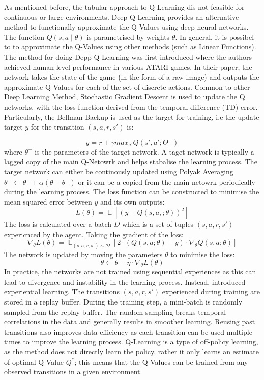 \documentclass[12pt,a4paper]{report}
\DeclareMathOperator{\EX}{\mathbb{E}}
\begin{document}
As mentioned before, the tabular approach to Q-Learning dis not feasible for continuous or large environments. Deep Q Learning provides an alternative method to functionally approximate the Q-Values using deep neural networks. The function $Q(s, a \mid \theta)$ is parametrised by weights $\theta$. In general, it is possibel to to approximate the Q-Values using other methods (such as Linear Functions).
The method for doing Depp Q Learning was first introduced \cite{Mnih2015} where the authors achieved human level performance in various ATARI games. In their paper, the network takes the state of the game (in the form of a raw image) and outputs the approximate Q-Values for each of the set of discrete actions. Common to other Deep Learning Method, Stochastic Gradient Descent is used to update the Q networks, with the loss function derived from the temporal difference (TD) error. Particularly, the Bellman Backup is used as the target for training, i.e the update target $y$ for the transition $(s, a, r, s')$ is: 

\[
  y = r + \gamma max_{a'} Q(s', a'; \Theta^-)
\]
where $\theta^-$ is the parameters of the target network. A taget network is typically a lagged copy of the main Q-Netowrk and helps stabalise the learning process. The target network can either be continously updated using Polyak Averaging $\theta^- \leftarrow \theta^-+ \alpha (\theta - \theta^-)$ or it can be a copied from the main netowrk periodically during the learning process. 
The loss function can be constructed to minimise the mean squared error between $y$ and its own outputs: 
\[
  L(\theta) = \EX[(y - Q(s, a, ; \theta))^2]
\] 
The loss is calculated over a batch $D$ which is a set of tuples $(s, a, r, s')$ expericnced by the agent. Taking the gradient of the loss:
\[
\nabla_{\theta} L(\theta) = \EX_{(s, a, r, s') \sim \mathcal{D}} [ 2 \cdot \left( Q(s, a; \theta) - y \right) \cdot \nabla_{\theta} Q(s, a; \theta) ]
\]
The network is updated by moving the parameters $\theta$ to minimise the loss:
\[
  \theta \leftarrow \theta - \eta \cdot \nabla_{\theta} L(\theta)
\] 
In practice, the networks are not trained using sequential experiences as this can lead to divergence and instability in the learning process. Instead, \cite{Mnih2015} introduced experiential learning. The transitions $(s, a, r, s')$ experienced during training are stored in a replay buffer. During the training step, a mini-batch is randomly sampled from the replay buffer. The random sampling breaks temporal correlations in the data and generally results in smoother learning. Reusing past transitions also improves data efficiency as each transition can be used multiple times to improve the learning process. Q-Learning is a type of off-policy learning, as the method does not directly learn the policy, rather it only learns an estimate of optimal Q-Value $Q^*$; this means that the Q-Values can be trained from any observed transitions in a given environment. 
\end{document}

